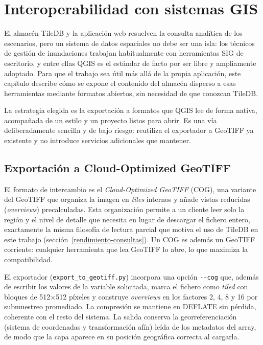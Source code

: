 \chapter{Interoperabilidad con sistemas GIS}\label{cap:gis}

El almacén TileDB y la aplicación web resuelven la consulta analítica de los escenarios, pero un sistema de datos espaciales no debe ser una isla: los técnicos de gestión de inundaciones trabajan habitualmente con herramientas SIG de escritorio, y entre ellas QGIS es el estándar de facto por ser libre y ampliamente adoptado. Para que el trabajo sea útil más allá de la propia aplicación, este capítulo describe cómo se expone el contenido del almacén disperso a esas herramientas mediante formatos abiertos, sin necesidad de que conozcan TileDB.

La estrategia elegida es la exportación a formatos que QGIS lee de forma nativa, acompañada de un estilo y un proyecto listos para abrir. Es una vía deliberadamente sencilla y de bajo riesgo: reutiliza el exportador a GeoTIFF ya existente y no introduce servicios adicionales que mantener.

\section{Exportación a Cloud-Optimized GeoTIFF}\label{gis-cog}

El formato de intercambio es el \textit{Cloud-Optimized GeoTIFF} (COG), una variante del GeoTIFF que organiza la imagen en \textit{tiles} internos y añade vistas reducidas (\textit{overviews}) precalculadas. Esta organización permite a un cliente leer solo la región y el nivel de detalle que necesita en lugar de descargar el fichero entero, exactamente la misma filosofía de lectura parcial que motiva el uso de TileDB en este trabajo (sección~\ref{rendimiento-consultas}). Un COG es además un GeoTIFF corriente: cualquier herramienta que lea GeoTIFF lo abre, lo que maximiza la compatibilidad.

El exportador (\texttt{export\_to\_geotiff.py}) incorpora una opción \texttt{-{}-cog} que, además de escribir los valores de la variable solicitada, marca el fichero como \textit{tiled} con bloques de 512$\times$512 píxeles y construye \textit{overviews} en los factores 2, 4, 8 y 16 por submuestreo promediado. La compresión se mantiene en DEFLATE sin pérdida, coherente con el resto del sistema. La salida conserva la georreferenciación (sistema de coordenadas y transformación afín) leída de los metadatos del array, de modo que la capa aparece en su posición geográfica correcta al cargarla.

